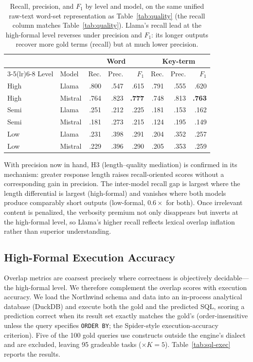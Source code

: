 \documentclass[runningheads]{llncs}
\begin{document}
\begin{table}[htbp]
\centering
\caption{Recall, precision, and $F_1$ by level and model, on the same unified raw-text word-set representation as Table~\ref{tab:quality} (the recall column matches Table~\ref{tab:quality}). Llama's recall lead at the high-formal level reverses under precision and $F_1$: its longer outputs recover more gold terms (recall) but at much lower precision.}
\label{tab:precision}
\setlength{\tabcolsep}{5pt}
\begin{tabular}{llrrrrrr}
\toprule
& & \multicolumn{3}{c}{Word} & \multicolumn{3}{c}{Key-term} \\
\cmidrule(lr){3-5}\cmidrule(lr){6-8}
Level & Model & Rec. & Prec. & $F_1$ & Rec. & Prec. & $F_1$ \\
\midrule
High & Llama   & .800 & .547 & .615 & .791 & .555 & .620 \\
High & Mistral & .764 & .823 & \textbf{.777} & .748 & .813 & \textbf{.763} \\
Semi & Llama   & .251 & .212 & .225 & .181 & .153 & .162 \\
Semi & Mistral & .181 & .273 & .215 & .124 & .195 & .149 \\
Low  & Llama   & .231 & .398 & .291 & .204 & .352 & .257 \\
Low  & Mistral & .229 & .396 & .290 & .205 & .353 & .259 \\
\bottomrule
\end{tabular}
\end{table}

With precision now in hand, H3 (length--quality mediation) is confirmed in its mechanism: greater response length raises recall-oriented scores without a corresponding gain in precision. The inter-model recall gap is largest where the length differential is largest (high-formal) and vanishes where both models produce comparably short outputs (low-formal, $0.6\times$ for both). Once irrelevant content is penalized, the verbosity premium not only disappears but inverts at the high-formal level, so Llama's higher recall reflects lexical overlap inflation rather than superior understanding.

\subsection{High-Formal Execution Accuracy}
\label{sec:sql-exec}

Overlap metrics are coarsest precisely where correctness is objectively decidable---the high-formal level. We therefore complement the overlap scores with execution accuracy. We load the Northwind schema and data into an in-process analytical database (DuckDB) and execute both the gold and the predicted SQL, scoring a prediction correct when its result set exactly matches the gold's (order-insensitive unless the query specifies \texttt{ORDER BY}; the Spider-style execution-accuracy criterion). Five of the 100 gold queries use constructs outside the engine's dialect and are excluded, leaving 95 gradeable tasks ($\times K{=}5$). Table~\ref{tab:sql-exec} reports the results.
\end{document}
